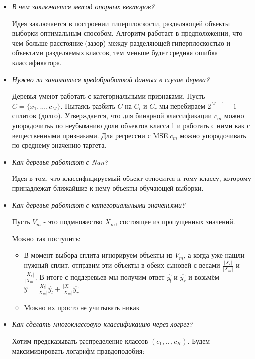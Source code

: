 \documentclass[12pt]{article}
\begin{document}
\begin{itemize}
\item \textit{В чем заключается метод опорных векторов?}

Идея заключается в построении гиперплоскости, разделяющей объекты выборки оптимальным способом. Алгоритм работает в предположении, что чем больше расстояние (зазор) между разделяющей гиперплоскостью и объектами разделяемых классов, тем меньше будет средняя ошибка классификатора.

\item \textit{Нужно ли заниматься предобработкой данных в случае дерева?}

Деревья умеют работать с категориальными признаками. Пусть $C = \{x_1, ..., c_M\} $. Пытаясь разбить $C$ на $C_l$ и $C_r$ мы перебираем $2^{M-1}-1$ сплитов (долго). Утверждается, что для бинарной классификации $c_m$ можно упорядочитьь по неубыванию доли объектов класса 1 и работать с ними как с вещественными признаками.
Для регрессии с MSE $c_m$ можно упорядочивать по среднему значению таргета.


\item \textit{Как деревья работают с Nan?}

Идея в том, что 
классифицируемый объект относится к тому классу, которому принадлежат ближайшие к нему объекты обучающей выборки.

\item \textit{Как деревья работают с категориальными значениями?}

Пусть $V_m$ - это подмножество $X_m$, состоящее из пропущенных значений.

Можно так поступить:

\begin{itemize}
\item В момент выбора сплита игнорируем объекты из $V_m$, а когда уже нашли нужный сплит, отправим эти объекты в обеих сыновей с весами $\frac{|X_l|}{|X_m|}$ и $\frac{|X_r|}{|X_m|}$. В итоге с поддеревьев мы получим ответ $\hat{y_l}$ и $\hat{y_r}$ и возьмём $\hat{y} = \frac{|X_l|}{|X_m|} \hat{y_l} + \frac{|X_r|}{|X_m|} \hat{y_r}$

\item Можно их просто не учитывать никак
\end{itemize}

\item \textit{ Как сделать многоклассовую классификацию через логрег?}

Хотим предсказывать распределение классов $(c_1, ..., c_K)$. Будем максимизировать логарифм правдоподобия:


\end{itemize}
\end{document}
